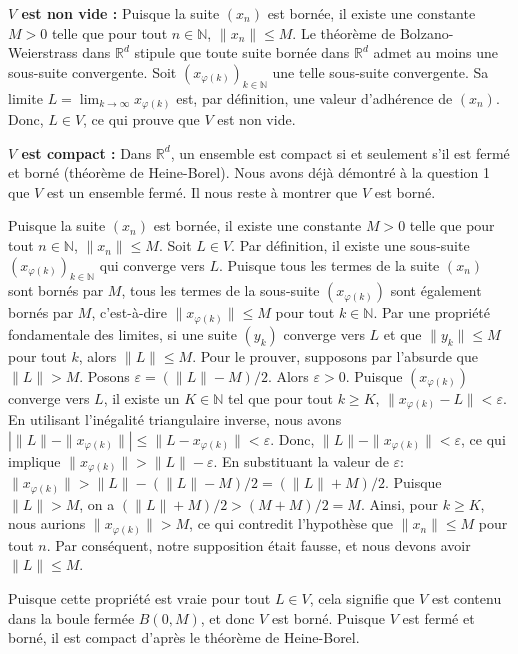 \documentclass{report}
\begin{document}
\textbf{$V$ est non vide :}
Puisque la suite $(x_n)$ est bornée, il existe une constante $M > 0$ telle que pour tout $n \in \mathbb{N}$, $\|x_n\| \le M$.
Le théorème de Bolzano-Weierstrass dans $\mathbb{R}^d$ stipule que toute suite bornée dans $\mathbb{R}^d$ admet au moins une sous-suite convergente.
Soit $(x_{\varphi(k)})_{k \in \mathbb{N}}$ une telle sous-suite convergente. Sa limite $L = \lim_{k \to \infty} x_{\varphi(k)}$ est, par définition, une valeur d'adhérence de $(x_n)$.
Donc, $L \in V$, ce qui prouve que $V$ est non vide.

\textbf{$V$ est compact :}
Dans $\mathbb{R}^d$, un ensemble est compact si et seulement s'il est fermé et borné (théorème de Heine-Borel).
Nous avons déjà démontré à la question 1 que $V$ est un ensemble fermé. Il nous reste à montrer que $V$ est borné.

Puisque la suite $(x_n)$ est bornée, il existe une constante $M > 0$ telle que pour tout $n \in \mathbb{N}$, $\|x_n\| \le M$.
Soit $L \in V$. Par définition, il existe une sous-suite $(x_{\varphi(k)})_{k \in \mathbb{N}}$ qui converge vers $L$.
Puisque tous les termes de la suite $(x_n)$ sont bornés par $M$, tous les termes de la sous-suite $(x_{\varphi(k)})$ sont également bornés par $M$, c'est-à-dire $\|x_{\varphi(k)}\| \le M$ pour tout $k \in \mathbb{N}$.
Par une propriété fondamentale des limites, si une suite $(y_k)$ converge vers $L$ et que $\|y_k\| \le M$ pour tout $k$, alors $\|L\| \le M$.
Pour le prouver, supposons par l'absurde que $\|L\| > M$. Posons $\varepsilon = (\|L\| - M)/2$. Alors $\varepsilon > 0$.
Puisque $(x_{\varphi(k)})$ converge vers $L$, il existe un $K \in \mathbb{N}$ tel que pour tout $k \ge K$, $\|x_{\varphi(k)} - L\| < \varepsilon$.
En utilisant l'inégalité triangulaire inverse, nous avons $|\|L\| - \|x_{\varphi(k)}\|| \le \|L - x_{\varphi(k)}\| < \varepsilon$.
Donc, $\|L\| - \|x_{\varphi(k)}\| < \varepsilon$, ce qui implique $\|x_{\varphi(k)}\| > \|L\| - \varepsilon$.
En substituant la valeur de $\varepsilon$: $\|x_{\varphi(k)}\| > \|L\| - (\|L\| - M)/2 = (\|L\| + M)/2$.
Puisque $\|L\| > M$, on a $(\|L\| + M)/2 > (M+M)/2 = M$.
Ainsi, pour $k \ge K$, nous aurions $\|x_{\varphi(k)}\| > M$, ce qui contredit l'hypothèse que $\|x_n\| \le M$ pour tout $n$.
Par conséquent, notre supposition était fausse, et nous devons avoir $\|L\| \le M$.

Puisque cette propriété est vraie pour tout $L \in V$, cela signifie que $V$ est contenu dans la boule fermée $B(0, M)$, et donc $V$ est borné.
Puisque $V$ est fermé et borné, il est compact d'après le théorème de Heine-Borel.
\end{document}
